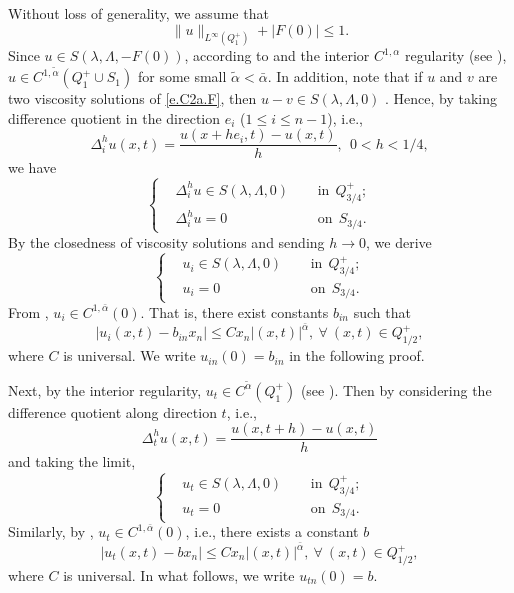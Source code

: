 \documentclass[preprint,12pt]{elsarticle}
\theoremstyle{definition}
\theoremstyle{remark}
\numberwithin{equation}{section}
\begin{document}
\proof Without loss of generality, we assume that
\begin{equation*}
\|u\|_{L^{\infty}(Q_1^+)}+|F(0)|\leq 1.
\end{equation*}
Since $u\in S(\lambda,\Lambda,-F(0))$, according to  and the interior $C^{1,\alpha}$ regularity (see \cite[Theorem 4.8]{MR1139064}), $u\in C^{1,\tilde\alpha}(Q_1^+ \cup S_1)$ for some small $\tilde{\alpha}<\bar{\alpha}$. In addition, note that if $u$ and $v$ are two viscosity solutions of \cref{e.C2a.F}, then $u-v\in S(\lambda,\Lambda,0)$ \cite[Theorem 4.6]{MR1139064}. Hence, by taking difference quotient in the direction $e_i$ ($1\leq i\leq n-1$), i.e.,
\begin{equation*}
  \Delta^{h}_{i} u (x,t)=\frac{u(x+he_i,t)-u(x,t)}{h}, ~~0<h<1/4,
\end{equation*}
we have
\begin{equation*}
\left\{\begin{aligned}
&\Delta^{h}_{i} u\in S(\lambda,\Lambda,0)&& ~~\mbox{in}~~Q_{3/4}^+;\\
&\Delta^{h}_{i} u=0&& ~~\mbox{on}~~S_{3/4}.
\end{aligned}\right.
\end{equation*}
By the closedness of viscosity solutions and sending $h\rightarrow 0$, we derive
\begin{equation*}
\left\{\begin{aligned}
&u_{i}\in S(\lambda,\Lambda,0)&& ~~\mbox{in}~~Q_{3/4}^+;\\
&u_{i}=0&& ~~\mbox{on}~~S_{3/4}.
\end{aligned}\right.
\end{equation*}
From , $u_i\in C^{1,\bar{\alpha}}(0)$. That is, there exist constants $b_{in}$ such that
\begin{equation}\label{e.C2a.F3}
|u_i(x,t)-b_{in}x_n|\leq Cx_n|(x,t)|^{\bar{\alpha}},~\forall ~(x,t)\in Q_{1/2}^+,
\end{equation}
where $C$ is universal. We write $u_{in}(0)=b_{in}$ in the following proof.

Next, by the interior regularity, $u_t\in C^{\tilde\alpha}(Q_1^+)$ (see \cite[Theorem 4.9]{MR1139064}). Then by considering the difference quotient along direction $t$, i.e.,
\begin{equation*}
  \Delta^{h}_{t} u(x,t)=\frac{u(x,t+h)-u(x,t)}{h}
\end{equation*}
and taking the limit,
\begin{equation*}
\left\{\begin{aligned}
&u_{t}\in S(\lambda,\Lambda,0)&& ~~\mbox{in}~~Q_{3/4}^+;\\
&u_{t}=0&& ~~\mbox{on}~~S_{3/4}.
\end{aligned}\right.
\end{equation*}
Similarly, by , $u_t \in C^{1,\bar{\alpha}}(0)$, i.e., there exists a constant $b$
\begin{equation}\label{e.C2a.F3.1}
|u_t(x,t)-bx_n|\leq Cx_n|(x,t)|^{\bar{\alpha}},~\forall ~(x,t)\in Q_{1/2}^+,
\end{equation}
where $C$ is universal. In what follows, we write $u_{tn}(0)=b$.
\end{document}
